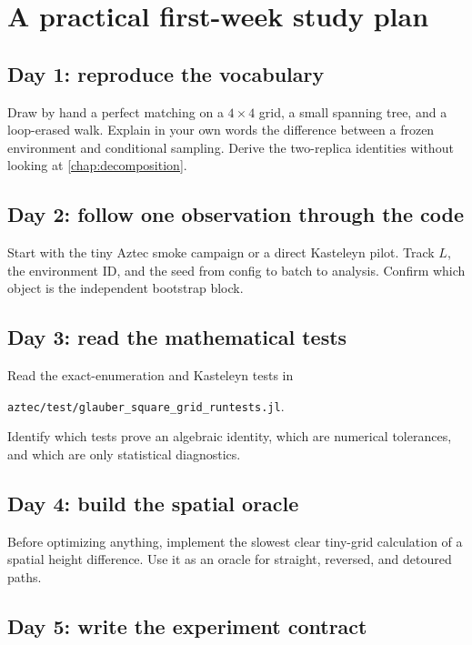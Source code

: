 \documentclass[11pt,a4paper,oneside,openany]{memoir}
\newcommand{\code}[1]{\texttt{#1}}
\newcommand{\1}{\bm{1}}
\begin{document}
\chapter{A practical first-week study plan}

\section{Day 1: reproduce the vocabulary}

Draw by hand a perfect matching on a $4\times4$ grid, a small spanning tree,
and a loop-erased walk. Explain in your own words the difference between a
frozen environment and conditional sampling. Derive the two-replica identities
without looking at \cref{chap:decomposition}.

\section{Day 2: follow one observation through the code}

Start with the tiny Aztec smoke campaign or a direct Kasteleyn pilot. Track
$L$, the environment ID, and the seed from config to batch to analysis.
Confirm which object is the independent bootstrap block.

\section{Day 3: read the mathematical tests}

Read the exact-enumeration and Kasteleyn tests in
\begin{center}\code{aztec/test/glauber\_square\_grid\_runtests.jl}.\end{center}
Identify which tests prove
an algebraic identity, which are numerical tolerances, and which are only
statistical diagnostics.

\section{Day 4: build the spatial oracle}

Before optimizing anything, implement the slowest clear tiny-grid calculation
of a spatial height difference. Use it as an oracle for straight, reversed,
and detoured paths.

\section{Day 5: write the experiment contract}
\end{document}
